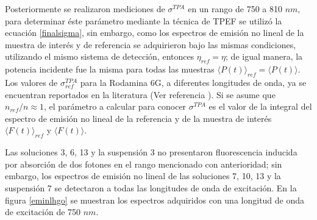 \begin{table}[h]
\centering
{} 
\caption{ Valores obtenidos de eficiencia cu\'antica de fluorescencia $\Phi_f$ de las soluciones 3, 6, 7, 10 y 13 y las suspensiones 3 y 7.\label{tablahgo}}
\end{table}

Posteriormente se realizaron mediciones de $\sigma^{TPA}$ en un rango de 750 a 810 $nm$, para determinar \'este par\'ametro mediante la t\'ecnica de TPEF se utiliz\'o la ecuaci\'on \ref{finalsigma}, sin embargo, como los espectros de emisi\'on no lineal de la muestra de inter\'es y de referencia se adquirieron bajo las mismas condiciones, utilizando el mismo sistema de detecci\'on, entonces $\eta_{ref}=\eta$; de igual manera, la potencia incidente fue la misma para todas las muestras $\langle P(t)\rangle_{ref}=\langle P(t)\rangle$. Los valores de $\sigma^{TPA}_{ref}$ para la Rodamina 6G, a diferentes longitudes de onda, ya se encuentran reportados en la literatura (Ver referencia \cite{rusitos}). Si se asume que $n_{ref}/n\approx 1$, el par\'ametro a calcular para conocer $\sigma^{TPA}$ es el valor de la integral del espectro de emisi\'on no lineal de la referencia y de la muestra de inter\'es $\langle F(t)\rangle_{ref}$ y $\langle F(t)\rangle$.

Las soluciones 3, 6, 13 y la suspensi\'on 3 no presentaron fluorescencia inducida por absorci\'on de dos fotones en el rango mencionado con anterioridad; sin embargo, los espectros de emisi\'on no lineal de las soluciones 7, 10, 13 y la suspensi\'on 7 se detectaron a todas las longitudes de onda de excitaci\'on. En la figura \ref{eminlhgo} se muestran los espectros adquiridos con una longitud de onda de excitaci\'on de 750 $nm$. 

